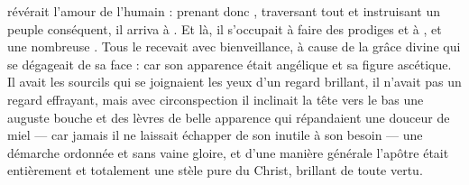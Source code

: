  révérait l'amour de l'humain : %
 prenant donc ,
traversant tout et instruisant un peuple conséquent, il arriva à . %
Et là, il s'occupait à faire des prodiges et à , et une  nombreuse .
 
Tous le recevait avec bienveillance, à cause de la grâce divine qui se dégageait  de sa face :
car son apparence était angélique et sa figure ascétique.
Il avait les sourcils qui se joignaient %
les yeux d'un regard brillant,
il n'avait pas un regard effrayant, mais avec circonspection il inclinait la tête vers le bas %
une auguste bouche et des lèvres de belle apparence qui répandaient une douceur de miel --- 
car jamais il ne laissait  échapper de son inutile à son besoin --- 
une démarche ordonnée et sans vaine gloire, 
et d'une manière générale l'apôtre   était entièrement et totalement une stèle pure du Christ, brillant de toute vertu. %

